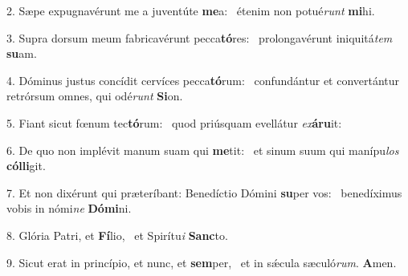 2. Sæpe expugnavérunt me a juventúte \textbf{me}a: \ast\  étenim non potué\textit{runt} \textbf{mi}hi.\

3. Supra dorsum meum fabricavérunt pecca\textbf{tó}res: \ast\  prolongavérunt iniquitá\textit{tem} \textbf{su}am.\

4. Dóminus justus concídit cervíces pecca\textbf{tó}rum: \ast\  confundántur et convertántur retrórsum omnes, qui odé\textit{runt} \textbf{Si}on.\

5. Fiant sicut fœnum tec\textbf{tó}rum: \ast\  quod priúsquam evellátur \textit{ex}\textbf{á}\textbf{ru}it:\

6. De quo non implévit manum suam qui \textbf{me}tit: \ast\  et sinum suum qui manípu\textit{los} \textbf{cól}\textbf{li}git.\

7. Et non dixérunt qui præteríbant: Benedíctio Dómini \textbf{su}per vos: \ast\  benedíximus vobis in nómi\textit{ne} \textbf{Dó}\textbf{mi}ni.\

8. Glória Patri, et \textbf{Fí}lio, \ast\  et Spirítu\textit{i} \textbf{Sanc}to.\

9. Sicut erat in princípio, et nunc, et \textbf{sem}per, \ast\  et in sǽcula sæculó\textit{rum}. \textbf{A}men.\

